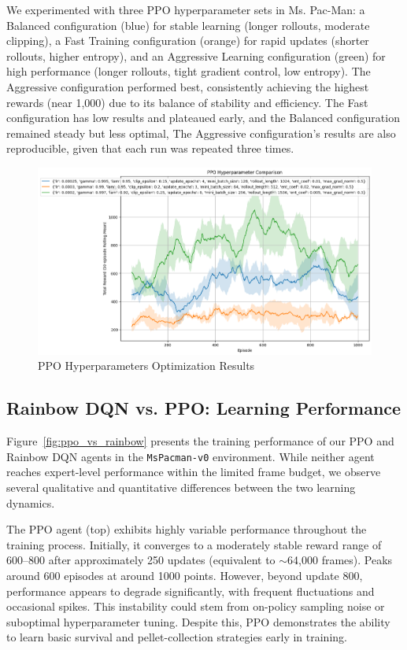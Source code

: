 \documentclass{article}
\begin{document}
We experimented with three PPO hyperparameter sets in Ms. Pac-Man: a Balanced configuration (blue) for stable learning (longer rollouts, moderate clipping), a Fast Training configuration (orange) for rapid updates (shorter rollouts, higher entropy), and an Aggressive Learning configuration (green) for high performance (longer rollouts, tight gradient control, low entropy). The Aggressive configuration performed best, consistently achieving the highest rewards (near 1,000) due to its balance of stability and efficiency. The Fast configuration has low results and plateaued early, and the Balanced configuration remained steady but less optimal, The Aggressive configuration’s results are also reproducible, given that each run was repeated three times.

\begin{figure}[h]
    \centering
    \includegraphics{PPO_output_hyperparameters_3set.png}
    \caption{PPO Hyperparameters Optimization Results}
    \label{fig:ppo_hyperparams}
\end{figure}

\subsection{Rainbow DQN vs. PPO: Learning Performance}

Figure~\ref{fig:ppo_vs_rainbow} presents the training performance of our PPO and Rainbow DQN agents in the \texttt{MsPacman-v0} environment. While neither agent reaches expert-level performance within the limited frame budget, we observe several qualitative and quantitative differences between the two learning dynamics.

The PPO agent (top) exhibits highly variable performance throughout the training process. Initially, it converges to a moderately stable reward range of 600–800 after approximately 250 updates (equivalent to $\sim$64,000 frames). Peaks around 600 episodes at around 1000 points. However, beyond update 800, performance appears to degrade significantly, with frequent fluctuations and occasional spikes. This instability could stem from on-policy sampling noise or suboptimal hyperparameter tuning. Despite this, PPO demonstrates the ability to learn basic survival and pellet-collection strategies early in training.
\end{document}
